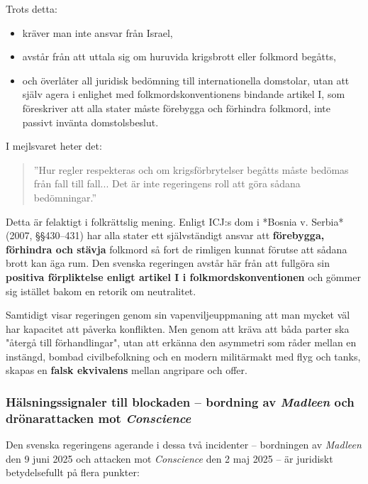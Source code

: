 Trots detta:
\begin{itemize}
\item kräver man inte ansvar från Israel,
\item avstår från att uttala sig om huruvida krigsbrott eller folkmord begåtts,
\item och överlåter all juridisk bedömning till internationella domstolar, utan att själv agera i enlighet med folkmordskonventionens bindande artikel I, som föreskriver att alla stater måste förebygga och förhindra folkmord, inte passivt invänta domstolsbeslut.
\end{itemize}

I mejlsvaret heter det:

\begin{quote}
”Hur regler respekteras och om krigsförbrytelser begåtts måste bedömas från fall till fall... Det är inte regeringens roll att göra sådana bedömningar.”
\end{quote}

Detta är felaktigt i folkrättslig mening. Enligt ICJ:s dom i *Bosnia v. Serbia* (2007, §§430–431) har alla stater ett 
självständigt ansvar att \textbf{förebygga, förhindra och stävja} folkmord så fort de rimligen kunnat förutse att sådana 
brott kan äga rum. Den svenska regeringen avstår här från att fullgöra sin \textbf{positiva förpliktelse enligt artikel I i 
folkmordskonventionen} och gömmer sig istället bakom en retorik om neutralitet.

Samtidigt visar regeringen genom sin vapenviljeuppmaning att man mycket väl har kapacitet att påverka konflikten. 
Men genom att kräva att båda parter ska "återgå till förhandlingar", utan att erkänna den asymmetri som råder 
mellan en instängd, bombad civilbefolkning och en modern militärmakt med flyg och tanks, skapas en \textbf{falsk ekvivalens} 
mellan angripare och offer.




\subsubsection{Hälsningssignaler till blockaden – bordning av \textit{Madleen} och drönarattacken mot \textit{Conscience}}

Den svenska regeringens agerande i dessa två incidenter – bordningen av \textit{Madleen} den 9 juni 2025 och attacken mot \textit{Conscience} den 2 maj 2025 – är juridiskt betydelsefullt på flera punkter:

